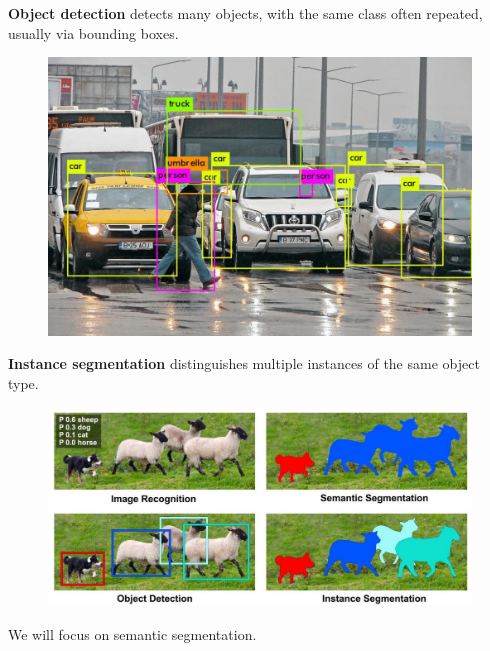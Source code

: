 \begin{definition}
    \textbf{Object detection} detects many objects, with the same class often repeated, usually via bounding boxes.

    \begin{figure}[H]
        \centering
        \includegraphics[width=1.0\textwidth]{.././assets/8.22.png}
    \end{figure}
\end{definition}

\begin{definition}
    \textbf{Instance segmentation} distinguishes multiple instances of the same object type.

    \begin{figure}[H]
        \centering
        \includegraphics[width=1.0\textwidth]{.././assets/8.23.png}
    \end{figure}
\end{definition}

We will focus on semantic segmentation.

